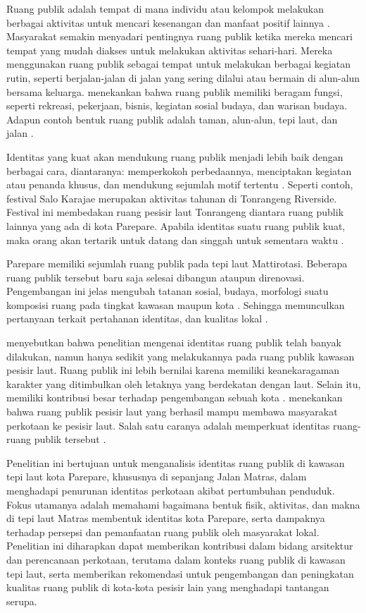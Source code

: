 \documentclass[11pt]{simart} %
\begin{document}
Ruang publik adalah tempat di mana individu atau kelompok melakukan berbagai aktivitas untuk mencari kesenangan dan manfaat positif lainnya \citep{hajmirsadeghi2012}. Masyarakat semakin menyadari pentingnya ruang publik ketika mereka mencari tempat yang mudah diakses untuk melakukan aktivitas sehari-hari. Mereka menggunakan ruang publik sebagai tempat untuk melakukan berbagai kegiatan rutin, seperti berjalan-jalan di jalan yang sering dilalui atau bermain di alun-alun bersama keluarga. \cite{hajmirsadeghi2012} menekankan bahwa ruang publik memiliki beragam fungsi, seperti rekreasi, pekerjaan, bisnis, kegiatan sosial budaya, dan warisan budaya. Adapun contoh bentuk ruang publik adalah taman, alun-alun, tepi laut, dan jalan \citep{hajmirsadeghi2012}.

Identitas yang kuat akan mendukung ruang publik menjadi lebih baik dengan berbagai cara, diantaranya: memperkokoh perbedaannya, menciptakan kegiatan atau penanda khusus, dan mendukung sejumlah motif tertentu \citep{hartanti2014}. Seperti contoh, festival Salo Karajae merupakan aktivitas tahunan di Tonrangeng Riverside. Festival ini membedakan ruang pesisir laut Tonrangeng diantara ruang publik lainnya yang ada di kota Parepare. Apabila identitas suatu ruang publik kuat, maka orang akan tertarik untuk datang dan singgah untuk sementara waktu \citep{oktay2002}.

Parepare memiliki sejumlah ruang publik pada tepi laut Mattirotasi. Beberapa ruang publik tersebut baru saja selesai dibangun ataupun direnovasi. Pengembangan ini jelas mengubah tatanan sosial, budaya, morfologi suatu komposisi ruang pada tingkat kawasan maupun kota \citep{kaymaz2013,oktay2002}. Sehingga memunculkan pertanyaan terkait pertahanan identitas, dan kualitas lokal \citep{kaymaz2013}.

\cite{oktay2015} menyebutkan bahwa penelitian mengenai identitas ruang publik telah banyak dilakukan, namun hanya sedikit yang melakukannya pada ruang publik kawasan pesisir laut. Ruang publik ini lebih bernilai karena memiliki keanekaragaman karakter yang ditimbulkan oleh letaknya yang berdekatan dengan laut. Selain itu, memiliki kontribusi besar terhadap pengembangan sebuah kota \citep{hussein2014}. \cite{hussein2014} menekankan bahwa ruang publik pesisir laut yang berhasil mampu membawa masyarakat perkotaan ke pesisir laut. Salah satu caranya adalah memperkuat identitas ruang-ruang publik tersebut \citep{oktay2002}.

Penelitian ini bertujuan untuk menganalisis identitas ruang publik di kawasan tepi laut kota Parepare, khususnya di sepanjang Jalan Matras, dalam menghadapi penurunan identitas perkotaan akibat pertumbuhan penduduk. Fokus utamanya adalah memahami bagaimana bentuk fisik, aktivitas, dan makna di tepi laut Matras membentuk identitas kota Parepare, serta dampaknya terhadap persepsi dan pemanfaatan ruang publik oleh masyarakat lokal. Penelitian ini diharapkan dapat memberikan kontribusi dalam bidang arsitektur dan perencanaan perkotaan, terutama dalam konteks ruang publik di kawasan tepi laut, serta memberikan rekomendasi untuk pengembangan dan peningkatan kualitas ruang publik di kota-kota pesisir lain yang menghadapi tantangan serupa.
\end{document}
